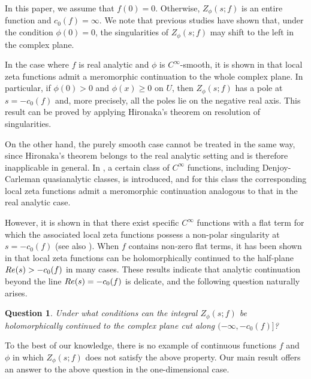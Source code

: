 \documentclass[10pt,a4paper]{amsart}
\numberwithin{equation}{section}
\newtheorem{question}[theorem]{Question}
\newcommand{\1}{{\bf 1}}
\begin{document}
In this paper, we assume that $f(0)=0$.
Otherwise, $Z_{\phi}(s;f)$ is an entire function 
and $c_0(f)=\infty$.
We note that previous studies \cite{CKN13, KaN16tams} 
have shown that, 
under the condition $\phi(0)=0$, 
the singularities of $Z_{\phi}(s;f)$ may shift 
to the left in the complex plane.

In the case where $f$ is real analytic and 
$\phi$ is $C^{\infty}$-smooth, 
it is shown in \cite{BeG69, Ati70} that 
local zeta functions admit a meromorphic continuation 
to the whole complex plane. 
In particular, if $\phi(0)>0$ and $\phi(x)\ge 0$ on $U$, 
then $Z_{\phi}(s;f)$ has a pole at $s=-c_0(f)$ and, 
more precisely, all the poles lie on the negative real axis. 
This result can be proved by applying 
Hironaka's theorem \cite{Hir64}
on resolution of singularities.

On the other hand, 
the purely smooth case cannot 
be treated in the same way, 
since Hironaka's theorem belongs to the real analytic setting 
and is therefore inapplicable in general. 
In \cite{KaN16jmsut}, 
a certain class of $C^{\infty}$ functions, 
including Denjoy-Carleman quasianalytic classes,  
is introduced, 
and for this class the corresponding local zeta functions 
admit a meromorphic continuation analogous 
to that in the real analytic case.

However, 
it is shown in \cite{KaN19, KaM24}  
that there exist specific $C^{\infty}$ 
functions with a flat term 
for which the associated local zeta functions 
possess a non-polar singularity
at $s=-c_0(f)$ (see also \cite{Nos25}).  
When $f$ contains non-zero flat terms, 
it has been shown in 
\cite{Gre06, KaN19, KaN20, Kam24} 
that local zeta functions 
can be holomorphically continued 
to the half-plane ${\rm Re}(s)>-c_0(f)$ in 
many cases.
These results indicate that 
analytic continuation beyond the line 
${\rm Re}(s)=-c_0(f)$ is delicate, 
and the following question naturally arises.

\begin{question}
Under what conditions can the integral $Z_{\phi}(s;f)$
be holomorphically continued to the complex plane cut along 
$(-\infty,-c_0(f)]$?
\end{question}

To the best of our knowledge, 
there is no example of continuous functions 
$f$ and $\phi$ in which 
$Z_{\phi}(s;f)$ does not satisfy the above property.
Our main result offers an answer 
to the above question in the one-dimensional case.
\end{document}

